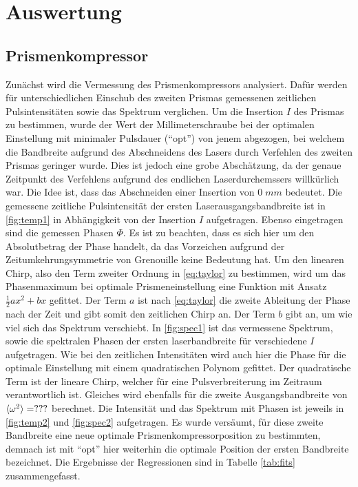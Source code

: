 \documentclass[twoside,        %
               BCOR12mm,       %
               english,ngerman, %
               fleqn,headsepline=false,footsepline=false
              ]{Vorlage/MFPREPORT}
\begin{document}
\section{Auswertung}
\label{sec:auswertung}
\subsection{Prismenkompressor}
Zunächst wird die Vermessung des Prismenkompressors analysiert. Dafür werden
für unterschiedlichen Einschub des zweiten Prismas gemessenen zeitlichen
Pulsintensitäten sowie das Spektrum verglichen. Um die Insertion $I$ des
Prismas zu bestimmen, wurde der Wert der Millimeterschraube bei der optimalen
Einstellung mit minimaler Pulsdauer (``opt'') von jenem abgezogen, bei welchem
die Bandbreite aufgrund des Abschneidens des Lasers durch Verfehlen des zweiten
Prismas geringer wurde. Dies ist jedoch eine grobe Abschätzung, da der genaue
Zeitpunkt des Verfehlens aufgrund des endlichen Laserdurchemssers willkürlich
war. Die Idee ist, dass das Abschneiden einer Insertion von $0\;mm$ bedeutet. Die gemessene zeitliche Pulsintensität der ersten Laserausgangsbandbreite ist in
\cref{fig:temp1} in Abhängigkeit von der Insertion $I$ aufgetragen. Ebenso
eingetragen sind die gemessen Phasen $\Phi$. Es ist zu beachten, dass es sich
hier um den Absolutbetrag der Phase handelt, da das Vorzeichen aufgrund der
Zeitumkehrungsymmetrie von Grenouille keine Bedeutung hat. Um den linearen Chirp, also den Term zweiter Ordnung in \cref{eq:taylor} zu bestimmen, wird um das
Phasenmaximum bei optimale Prismeneinstellung eine Funktion mit Ansatz
$\frac{1}{2}ax^2+bx$ gefittet. Der Term $a$ ist nach \cref{eq:taylor} die
zweite Ableitung der Phase nach der Zeit und gibt somit den zeitlichen Chirp
an. Der Term $b$ gibt an, um wie viel sich das Spektrum verschiebt.
In \cref{fig:spec1} ist das vermessene Spektrum, sowie die spektralen Phasen
der ersten laserbandbreite für verschiedene $I$ aufgetragen. Wie bei den
zeitlichen Intensitäten wird auch hier die Phase für die optimale Einstellung
mit einem quadratischen Polynom gefittet. Der quadratische Term ist der lineare Chirp,
welcher für eine Pulsverbreiterung im Zeitraum verantwortlich ist.
Gleiches wird ebenfalls für die zweite Ausgangsbandbreite von
$\braket{\omega^2}=???$ berechnet. Die Intensität und das Spektrum mit Phasen
ist jeweils in \cref{fig:temp2} und \cref{fig:spec2} aufgetragen. Es wurde
versäumt, für diese zweite Bandbreite eine neue optimale
Prismenkompressorposition zu bestimmten, demnach ist mit ``opt'' hier weiterhin
die optimale Position der ersten Bandbreite bezeichnet.
Die Ergebnisse der Regressionen sind in Tabelle \cref{tab:fits}
zusammengefasst.
\end{document}
